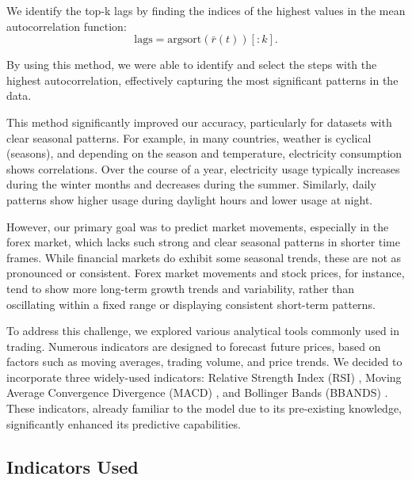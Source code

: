 We identify the top-k lags by finding the indices of the highest values in the mean autocorrelation function:
\[
	\text{lags} = \text{argsort}(\bar{r}(t))[:\!k].
\]

By using this method, we were able to identify and select the steps with the highest autocorrelation, effectively capturing the most significant patterns in the data.

This method significantly improved our accuracy, particularly for datasets with clear seasonal patterns. For example, in many countries, weather is cyclical (seasons), and depending on the season and temperature, electricity consumption shows correlations. Over the course of a year, electricity usage typically increases during the winter months and decreases during the summer. Similarly, daily patterns show higher usage during daylight hours and lower usage at night.

However, our primary goal was to predict market movements, especially in the forex market, which lacks such strong and clear seasonal patterns in shorter time frames. While financial markets do exhibit some seasonal trends, these are not as pronounced or consistent. Forex market movements and stock prices, for instance, tend to show more long-term growth trends and variability, rather than oscillating within a fixed range or displaying consistent short-term patterns.

To address this challenge, we explored various analytical tools commonly used in trading. Numerous indicators are designed to forecast future prices, based on factors such as moving averages, trading volume, and price trends. We decided to incorporate three widely-used indicators: Relative Strength Index (RSI) \cite{rsi}, Moving Average Convergence Divergence (MACD) \cite{macd}, and Bollinger Bands (BBANDS) \cite{bbands}. These indicators, already familiar to the model due to its pre-existing knowledge, significantly enhanced its predictive capabilities.


\subsection{Indicators Used}

